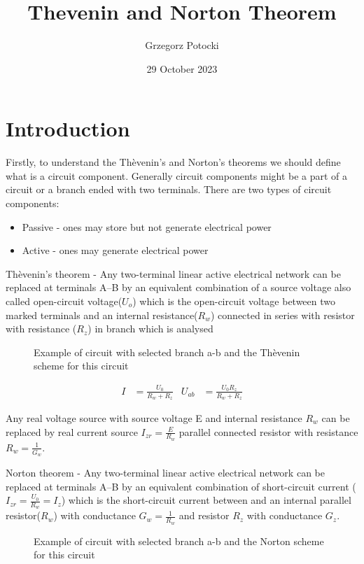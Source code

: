 \documentclass[]{scrartcl}
\title{Thevenin and Norton Theorem}
\author{Grzegorz Potocki}
\date{29 October 2023}
\begin{document}
	


\section{Introduction}

Firstly, to understand the Th\`evenin's and Norton's theorems we should define what is a circuit component. Generally circuit components might be a part of a circuit or a branch ended with two terminals. There are two types of circuit components:
\begin{itemize}
    \item Passive - ones may store but not generate electrical power
    \item Active - ones may generate electrical power
\end{itemize}

Th\`evenin's theorem - Any two-terminal linear active electrical network can be replaced at terminals A–B by an equivalent combination of a source voltage also called open-circuit voltage($U_o$) which is the open-circuit voltage between two marked terminals and an internal resistance($R_w$) connected in series with resistor with resistance ($R_z$) in branch which is analysed

\begin{figure}[H]
	\centering
	
	\caption{Example of circuit with selected branch a-b and the Th\`evenin scheme for this circuit}
	\label{fig:circuitfig_thevenin}
\end{figure}

\begin{align}
I&=\frac{U_{0}}{R_{w}+R_{z}} & U_{ab}&=\frac{U_0 R_z}{R_w+R_z}
\end{align}

Any real voltage source with source voltage E and internal resistance $R_w$ can be replaced by real current source $I_{zr}=\frac{E}{R_w}$ parallel connected resistor with resistance $R_w=\frac{1}{G_w}$. \newline

Norton theorem - Any two-terminal linear active electrical network can be replaced at terminals A–B by an equivalent combination of short-circuit current ($I_{zr}=\frac{U_0}{R_w}=I_z$) which is the short-circuit current between and an internal parallel resistor($R_w$) with conductance $G_w=\frac{1}{R_w}$ and resistor $R_z$ with conductance $G_z$.

\begin{figure}[H]
	\centering
	
	\caption{Example of circuit with selected branch a-b and the Norton scheme for this circuit}
	\label{fig:circuitfig_norton}
\end{figure}
\end{document}
